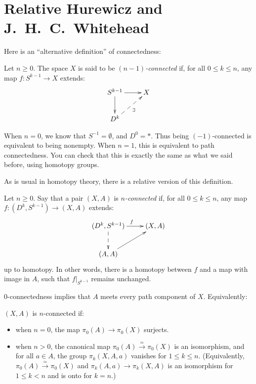 \section{Relative Hurewicz and J.~H.~C.~Whitehead}
Here is an ``alternative definition'' of connectedness:
\begin{definition}
    Let $n\geq 0$.
    The space $X$ is said to be \emph{$(n-1)$-connected} if, for all $0\leq k\leq n$, any map $f:S^{k-1}\to X$ extends:
    \begin{equation*}
	\xymatrix{
	S^{k-1}\ar[d]\ar[r] & X\\
	D^k\ar@{-->}[ur]_\exists & 
	}
    \end{equation*}
\end{definition}
When $n=0$, we know that $S^{-1} = \emptyset$, and $D^0 = \ast$.
Thus being $(-1)$-connected is equivalent to being nonempty.
When $n=1$, this is equivalent to path connectedness. You can check that this is exactly the same as what we said before, using homotopy groups.

As is usual in homotopy theory, there is a relative version of this definition.
\begin{definition}
    Let $n\geq 0$. Say that a pair $(X,A)$ is \emph{$n$-connected} if, for all $0\leq k\leq n$, any map $f:(D^k,S^{k-1}) \to (X,A)$ extends:
    \begin{equation*}
	\xymatrix{
	    (D^k,S^{k-1})\ar[r]^f\ar@{-->}[d] & (X,A)\\
	    (A,A)\ar[ur] & 
	    }
    \end{equation*}
    up to homotopy.
    In other words, there is a homotopy between $f$ and a map with image in $A$, such that $f|_{S^{k-1}}$ remains unchanged.
\end{definition}
$0$-connectedness implies that $A$ meets every path component of $X$.
Equivalently:
    \begin{definition}
	$(X,A)$ is $n$-connected if:
	\begin{itemize}
	    \item when $n=0$, the map $\pi_0(A)\to \pi_0(X)$ surjects.
	    \item when $n>0$, the canonical map $\pi_0(A)\xrightarrow{\simeq}\pi_0(X)$ is an isomorphism,
		and for all $a\in A$, the group $\pi_k(X,A,a)$ vanishes for $1\leq k\leq n$.
		(Equivalently, $\pi_0(A)\xrightarrow{\simeq}\pi_0(X)$ and $\pi_k(A,a)\to\pi_k(X,A)$ is an isomorphism for $1\leq k<n$ and is onto for $k=n$.)
	\end{itemize}
    \end{definition}
